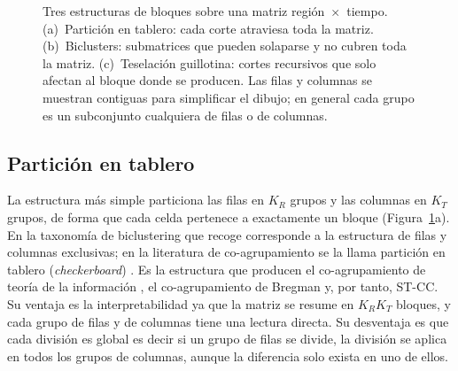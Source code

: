 \begin{figure}[t]
\centering
{}
\caption{Tres estructuras de bloques sobre una matriz región~$\times$~tiempo.
(a)~Partición en tablero: cada corte atraviesa toda la matriz. (b)~Biclusters:
submatrices que pueden solaparse y no cubren toda la matriz. (c)~Teselación
guillotina: cortes recursivos que solo afectan al bloque donde se producen. Las
filas y columnas se muestran contiguas para simplificar el dibujo; en general
cada grupo es un subconjunto cualquiera de filas o de columnas.}
\label{fig:estructuras}
\end{figure}

\subsection{Partición en tablero}

La estructura más simple particiona las filas en $K_R$ grupos y las columnas en
$K_T$ grupos, de forma que cada celda pertenece a exactamente un bloque
(Figura~\ref{fig:estructuras}a). En la taxonomía de biclustering que recoge
\cite{Castanho2024} corresponde a la estructura de filas y columnas exclusivas;
en la literatura de co-agrupamiento se la llama partición en tablero
(\emph{checkerboard}) \cite{Liu2021}. Es la estructura que producen el
co-agrupamiento de teoría de la información \cite{Dhillon2003}, el co-agrupamiento
de Bregman \cite{Banerjee2007} y, por tanto, ST-CC. Su ventaja es la
interpretabilidad ya que la matriz se resume en $K_R K_T$ bloques, y cada grupo de filas
y de columnas tiene una lectura directa. Su desventaja es que cada división es
global es decir si un grupo de filas se divide, la división se aplica en todos los
grupos de columnas, aunque la diferencia solo exista en uno de ellos.

